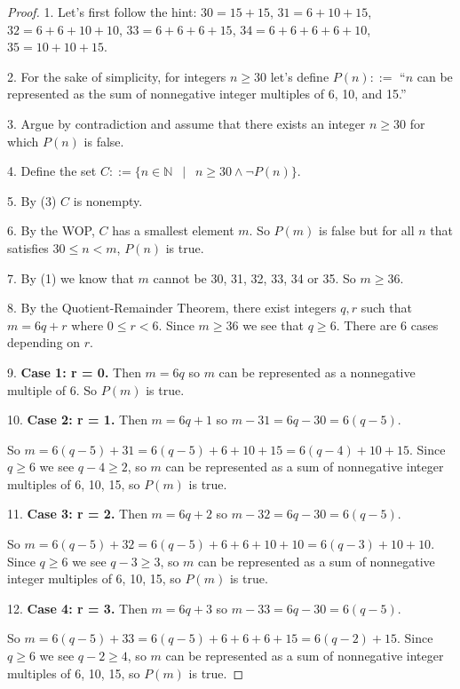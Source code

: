 \documentclass[14pt]{extarticle}
\begin{document}
\begin{proof}
1. Let's first follow the hint: $30 = 15 + 15$, $31 = 6 + 10 + 15$, $32 = 6 + 6 + 10 + 10$, $33 = 6 + 6 + 6 + 15$, $34 = 6 + 6 + 6 + 6 + 10$, $35 = 10 + 10 + 15$.

2. For the sake of simplicity, for integers $n \geq 30$ let's define $P(n) ::=$ ``$n$ can be represented as the sum of nonnegative integer multiples of 6, 10, and 15.'' 

3. Argue by contradiction and assume that there exists an integer $n \geq 30$ for which $P(n)$ is false.

4. Define the set $C ::= \{n \in \mathbb{N} \,\,\,\mid\,\,\, n \geq 30 \wedge \neg P(n)\}$.

5. By (3) $C$ is nonempty.

6. By the WOP, $C$ has a smallest element $m$. So $P(m)$ is false but for all $n$ that satisfies $30 \leq n < m$, $P(n)$ is true.

7. By (1) we know that $m$ cannot be 30, 31, 32, 33, 34 or 35. So $m \geq 36$.

8. By the Quotient-Remainder Theorem, there exist integers $q, r$ such that $m = 6q + r$ where $0 \leq r < 6$. Since $m \geq 36$ we see that $q \geq 6$. There are 6 cases depending on $r$.

9. \textbf{Case 1: r = 0.} Then $m = 6q$ so $m$ can be represented as a nonnegative multiple of 6. So $P(m)$ is true.

10. \textbf{Case 2: r = 1.} Then $m = 6q + 1$ so $m - 31 = 6q - 30 = 6(q - 5)$. 

So $m = 6(q - 5) + 31 = 6(q - 5) + 6 + 10 + 15 = 6(q - 4) + 10 + 15$. Since $q \geq 6$ we see $q - 4 \geq 2$, so $m$ can be represented as a sum of nonnegative integer multiples of 6, 10, 15, so $P(m)$ is true.

11. \textbf{Case 3: r = 2.} Then $m = 6q + 2$ so $m - 32 = 6q - 30 = 6(q - 5)$. 

So $m = 6(q - 5) + 32 = 6(q - 5) + 6 + 6 + 10 + 10 = 6(q - 3) + 10 + 10$. Since $q \geq 6$ we see $q - 3 \geq 3$, so $m$ can be represented as a sum of nonnegative integer multiples of 6, 10, 15, so $P(m)$ is true.

12. \textbf{Case 4: r = 3.} Then $m = 6q + 3$ so $m - 33 = 6q - 30 = 6(q - 5)$. 

So $m = 6(q - 5) + 33 = 6(q - 5) + 6 + 6 + 6 + 15 = 6(q - 2) + 15$. Since $q \geq 6$ we see $q - 2 \geq 4$, so $m$ can be represented as a sum of nonnegative integer multiples of 6, 10, 15, so $P(m)$ is true.


\end{proof}
\end{document}

